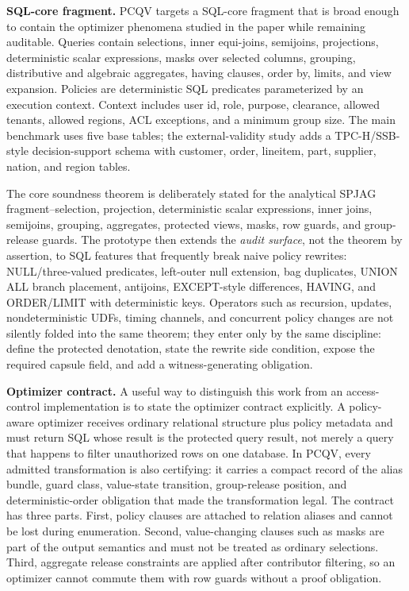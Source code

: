 \documentclass[conference]{IEEEtran}
\newcommand{\pcqv}{PCQV}
\begin{document}
\noindent\textbf{SQL-core fragment.}
\pcqv{} targets a SQL-core fragment that is broad enough to contain the optimizer phenomena studied in the paper while remaining auditable. Queries contain selections, inner equi-joins, semijoins, projections, deterministic scalar expressions, masks over selected columns, grouping, distributive and algebraic aggregates, having clauses, order by, limits, and view expansion. Policies are deterministic SQL predicates parameterized by an execution context. Context includes user id, role, purpose, clearance, allowed tenants, allowed regions, ACL exceptions, and a minimum group size. The main benchmark uses five base tables; the external-validity study adds a TPC-H/SSB-style decision-support schema with customer, order, lineitem, part, supplier, nation, and region tables.

The core soundness theorem is deliberately stated for the analytical SPJAG fragment--selection, projection, deterministic scalar expressions, inner joins, semijoins, grouping, aggregates, protected views, masks, row guards, and group-release guards. The prototype then extends the \emph{audit surface}, not the theorem by assertion, to SQL features that frequently break naive policy rewrites: NULL/three-valued predicates, left-outer null extension, bag duplicates, UNION ALL branch placement, antijoins, EXCEPT-style differences, HAVING, and ORDER/LIMIT with deterministic keys. Operators such as recursion, updates, nondeterministic UDFs, timing channels, and concurrent policy changes are not silently folded into the same theorem; they enter only by the same discipline: define the protected denotation, state the rewrite side condition, expose the required capsule field, and add a witness-generating obligation.


\noindent\textbf{Optimizer contract.}
A useful way to distinguish this work from an access-control implementation is to state the optimizer contract explicitly. A policy-aware optimizer receives ordinary relational structure plus policy metadata and must return SQL whose result is the protected query result, not merely a query that happens to filter unauthorized rows on one database. In \pcqv{}, every admitted transformation is also certifying: it carries a compact record of the alias bundle, guard class, value-state transition, group-release position, and deterministic-order obligation that made the transformation legal. The contract has three parts. First, policy clauses are attached to relation aliases and cannot be lost during enumeration. Second, value-changing clauses such as masks are part of the output semantics and must not be treated as ordinary selections. Third, aggregate release constraints are applied after contributor filtering, so an optimizer cannot commute them with row guards without a proof obligation.
\end{document}
